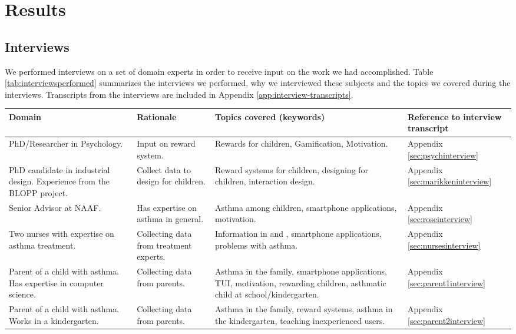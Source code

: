 \chapter{Results}
\label{chp:results}

\section{Interviews}
\label{sec:interviewresults}

We performed interviews on a set of domain experts in order to receive input on the work we had accomplished. Table \ref{tab:interviewsperformed} summarizes the interviews we performed, why we interviewed these subjects and the topics we covered during the interviews. Transcripts from the interviews are included in Appendix \ref{app:interview-transcripts}.   

\begin{sidewaystable}
\centering
\begin{tabular}{| p{4.0cm} | p{3.5cm} | p{6.0cm} | p{2.5cm} |}
	\hline
	\textbf{Domain} & \textbf{Rationale} & \textbf{Topics covered (keywords)} & \textbf{Reference to interview transcript} \\
	\hline
	 PhD/Researcher in Psychology. & Input on reward system. & Rewards for children, Gamification, Motivation. & Appendix \ref{sec:psychinterview} \\
	\hline
	 PhD candidate in industrial design. Experience from the BLOPP project. & Collect data to design for children. & Reward systems for children, designing for children, interaction design. & Appendix \ref{sec:marikkeninterview} \\
	\hline
	Senior Advisor at NAAF. & Has expertise on asthma in general. & Asthma among children, smartphone applications, motivation. & Appendix \ref{sec:roseinterview} \\
	\hline
	Two nurses with expertise on asthma treatment. & Collecting data from treatment experts. & Information in \ab{} and \app{}, smartphone applications, problems with asthma. & Appendix \ref{sec:nursesinterview} \\
	\hline
	Parent of a child with asthma. Has expertise in computer science. & Collecting data from parents. & Asthma in the family, smartphone applications, TUI, motivation, rewarding children, asthmatic child at school/kindergarten. & Appendix \ref{sec:parent1interview} \\
	\hline
	Parent of a child with asthma. Works in a kindergarten. & Collecting data from parents. & Asthma in the family, reward systems, asthma in the kindergarten, teaching inexperienced users. & Appendix \ref{sec:parent2interview} \\
	\hline     
\end{tabular}
\caption{Interviews performed during the project}
\label{tab:interviewsperformed}
\end{sidewaystable}  


